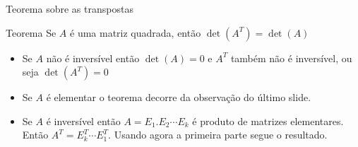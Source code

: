 \documentclass{beamer}
\begin{document}
  \begin{frame}{Teorema sobre as transpostas}
    \begin{block}{Teorema}
      Se $A$ é uma matriz quadrada, então $\det(A^T) = \det(A)$ 
    \end{block}
    \begin{itemize}
      \item Se $A$ não é inversível então $\det(A)=0$ e $A^T$ também não é inversível, ou seja $\det(A^T)=0$
      \item Se $A$ é elementar o teorema decorre da observação do último slide.
      \item Se $A$ é inversível então $A=E_1.E_2\cdots E_k$ é produto de matrizes elementares. Então $A^T = E_k^T\cdots E_1^T$. Usando agora a primeira parte segue o resultado.
    \end{itemize}
    \end{frame}
\end{document}
